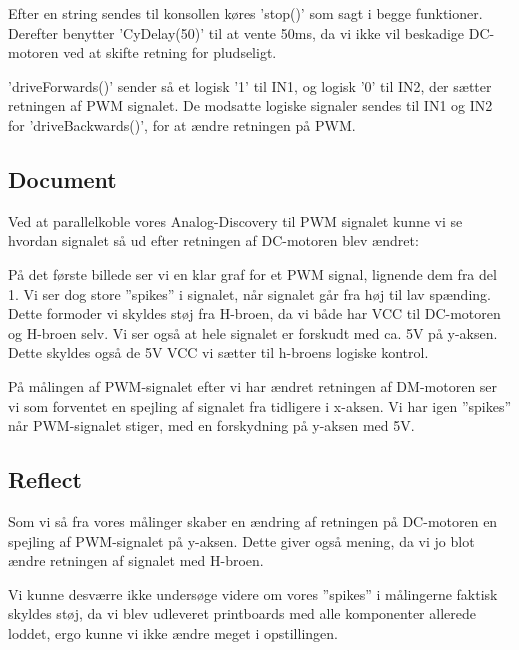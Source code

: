 \documentclass[../main.tex]{subfiles}
\begin{document}

Efter en string sendes til konsollen køres ’stop()’ som sagt i begge funktioner. Derefter benytter ’CyDelay(50)’ til at vente 50ms, da vi ikke vil beskadige DC-motoren ved at skifte retning for pludseligt.
 
’driveForwards()’ sender så et logisk ’1’ til IN1, og logisk ’0’ til IN2, der sætter retningen af PWM signalet. De modsatte logiske signaler sendes til IN1 og IN2 for ’driveBackwards()’, for at ændre retningen på PWM.

\subsection{Document}
Ved at parallelkoble vores Analog-Discovery til PWM signalet kunne vi se hvordan signalet så ud efter retningen af DC-motoren blev ændret:


På det første billede ser vi en klar graf for et PWM signal, lignende dem fra del 1. Vi ser dog store ”spikes” i signalet, når signalet går fra høj til lav spænding. Dette formoder vi skyldes støj fra H-broen, da vi både har VCC til DC-motoren og H-broen selv. Vi ser også at hele signalet er forskudt med ca. 5V på y-aksen. Dette skyldes også de 5V VCC vi sætter til h-broens logiske kontrol.


På målingen af PWM-signalet efter vi har ændret retningen af DM-motoren ser vi som forventet en spejling af signalet fra tidligere i x-aksen. Vi har igen ”spikes” når PWM-signalet stiger, med en forskydning på y-aksen med 5V.

\subsection{Reflect}    
Som vi så fra vores målinger skaber en ændring af retningen på DC-motoren en spejling af PWM-signalet på y-aksen. Dette giver også mening, da vi jo blot ændre retningen af signalet med H-broen.

Vi kunne desværre ikke undersøge videre om vores ”spikes” i målingerne faktisk skyldes støj, da vi blev udleveret printboards med alle komponenter allerede loddet, ergo kunne vi ikke ændre meget i opstillingen. 
\end{document}
